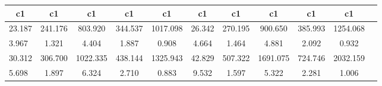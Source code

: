 \begin{table}[htbp]
\begin{tabular}{lcccccccccc} \hline \hline
 \multicolumn{1}{c}{ c1 }  & c1  & c1  & c1  & c1  & c1  & c1  & c1  & c1  & c1  \\  \hline 
   23.187 &   241.176 &   803.920 &   344.537 &  1017.098 &    26.342 &   270.195 &   900.650 &   385.993 &  1254.068 \\  
    3.967 &     1.321 &     4.404 &     1.887 &     0.908 &     4.664 &     1.464 &     4.881 &     2.092 &     0.932 \\  
   30.312 &   306.700 &  1022.335 &   438.144 &  1325.943 &    42.829 &   507.322 &  1691.075 &   724.746 &  2032.159 \\  
    5.698 &     1.897 &     6.324 &     2.710 &     0.883 &     9.532 &     1.597 &     5.322 &     2.281 &     1.006 \\  
\hline \hline \end{tabular}
\end{table}
